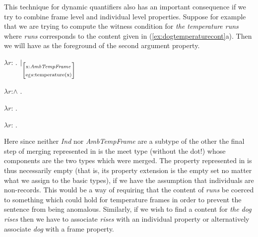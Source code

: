 This technique for dynamic quantifiers also has an important
consequence if we try to combine frame level and individual level
properties.  Suppose for example that we are trying to compute the
witness condition for \textit{the temperature runs} where
\textit{runs} corresponds to the content given in
(\ref{ex:dogtemperaturecont}a).  Then we will have \nexteg{}
as the foreground of the second argument property.
\begin{ex} 
\begin{subex} 
 
\item $\lambda r$: . 
            $|_\text{\smallrecord{\smalltfield{x}{\textit{AmbTempFrame}}\\
        \smallrfield{e}{$s$}{temperature(x)}}}$ 
 
\item $\lambda r$:\d{$\wedge$} . 

\item  $\lambda
  r$: . 

\item $\lambda
  r$: . 


 
\end{subex} 
\label{ex:runrestrictedambtemp}   
\end{ex}
Here since neither \textit{Ind} nor \textit{AmbTempFrame} are a
subtype of the other the final step of merging represented in
 is the meet type (without the dot!) whose components are
the two types which were merged.   The property represented in
\preveg{} is thus necessarily empty (that is,
its property extension is the empty set no matter what we assign to
the basic types), if we have the assumption that
individuals are non-records.  This would be a way of requiring that
the content of \textit{runs} be coerced to something which could hold
for temperature frames in order to prevent the sentence from being
anomalous.  Similarly, if we wish to find a content for \textit{the
  dog rises} then we have to associate \textit{rises} with an
individual property or alternatively associate \textit{dog} with a
frame property.

